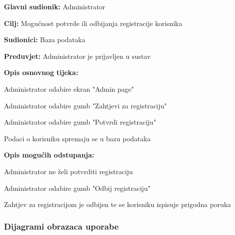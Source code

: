 					\begin{packed_item}
						
						\item \textbf{Glavni sudionik: }Administrator
						\item  \textbf{Cilj:} Mogućnost potvrde ili odbijanja registracije korisnika
						\item  \textbf{Sudionici:} Baza podataka
						\item  \textbf{Preduvjet:} Administrator je prijavljen u sustav
						\item  \textbf{Opis osnovnog tijeka:}
						
						\item[] \begin{packed_enum}
							
							\item Administrator odabire ekran "Admin page"
							\item Administrator odabire gumb "Zahtjevi za registraciju"
							\item Administrator odabire gumb "Potvrdi registraciju"
							\item Podaci o korisniku spremaju se u bazu podataka
						\end{packed_enum}
						
						\item  \textbf{Opis mogućih odstupanja:}
						
						\item[] \begin{packed_item}
							
							\item[3.a] Administrator ne želi potvrditi registraciju
							\item[] \begin{packed_enum}
								
								\item Administrator odabire gumb "Odbij registraciju"
								\item Zahtjev za registracijom je odbijen te se korisniku ispisuje prigodna poruka
								
							\end{packed_enum}
							
						\end{packed_item}
					\end{packed_item}
				
				\subsubsection{Dijagrami obrazaca uporabe}					
					
